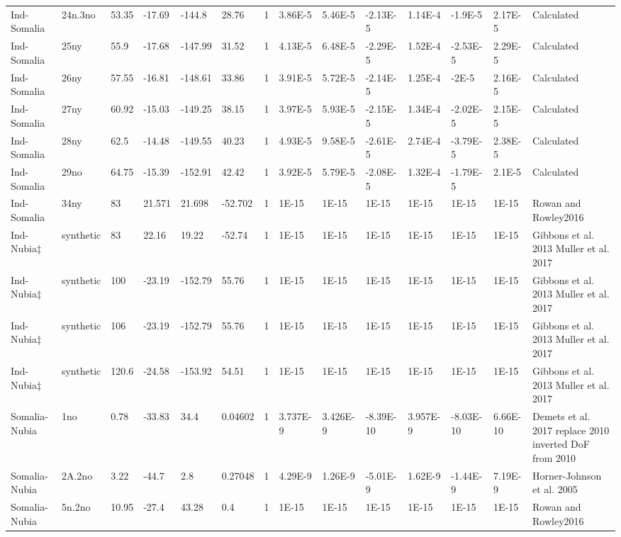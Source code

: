 \begin{landscape}
\begin{longtable}{@{}lllllllllllll>{\scriptsize}p{3.1cm}@{}}
Ind-Somalia & 24n.3no & 53.35 & -17.69 & -144.8 & 28.76 & 1 & 3.86E-5 & 5.46E-5 & -2.13E-5 & 1.14E-4 & -1.9E-5 & 2.17E-5 & Calculated \\
Ind-Somalia & 25ny & 55.9 & -17.68 & -147.99 & 31.52 & 1 & 4.13E-5 & 6.48E-5 & -2.29E-5 & 1.52E-4 & -2.53E-5 & 2.29E-5 & Calculated \\
Ind-Somalia & 26ny & 57.55 & -16.81 & -148.61 & 33.86 & 1 & 3.91E-5 & 5.72E-5 & -2.14E-5 & 1.25E-4 & -2E-5 & 2.16E-5 & Calculated \\
Ind-Somalia & 27ny & 60.92 & -15.03 & -149.25 & 38.15 & 1 & 3.97E-5 & 5.93E-5 & -2.15E-5 & 1.34E-4 & -2.02E-5 & 2.15E-5 & Calculated \\
Ind-Somalia & 28ny & 62.5 & -14.48 & -149.55 & 40.23 & 1 & 4.93E-5 & 9.58E-5 & -2.61E-5 & 2.74E-4 & -3.79E-5 & 2.38E-5 & Calculated \\
Ind-Somalia & 29no & 64.75 & -15.39 & -152.91 & 42.42 & 1 & 3.92E-5 & 5.79E-5 & -2.08E-5 & 1.32E-4 & -1.79E-5 & 2.1E-5 & Calculated \\
Ind-Somalia & 34ny & 83 & 21.571 & 21.698 & -52.702 & 1 & 1E-15 & 1E-15 & 1E-15 & 1E-15 & 1E-15 & 1E-15 & Rowan and Rowley2016 \\
Ind-Nubia$\ddagger$ & synthetic & 83 & 22.16 & 19.22 & -52.74 & 1 & 1E-15 & 1E-15 & 1E-15 & 1E-15 & 1E-15 & 1E-15 & Gibbons et al. 2013 Muller et al. 2017 \\
Ind-Nubia$\ddagger$ & synthetic & 100 & -23.19 & -152.79 & 55.76 & 1 & 1E-15 & 1E-15 & 1E-15 & 1E-15 & 1E-15 & 1E-15 & Gibbons et al. 2013 Muller et al. 2017 \\
Ind-Nubia$\ddagger$ & synthetic & 106 & -23.19 & -152.79 & 55.76 & 1 & 1E-15 & 1E-15 & 1E-15 & 1E-15 & 1E-15 & 1E-15 & Gibbons et al. 2013 Muller et al. 2017 \\
Ind-Nubia$\ddagger$ & synthetic & 120.6 & -24.58 & -153.92 & 54.51 & 1 & 1E-15 & 1E-15 & 1E-15 & 1E-15 & 1E-15 & 1E-15 & Gibbons et al. 2013 Muller et al. 2017 \\
Somalia-Nubia & 1no & 0.78 & -33.83 & 34.4 & 0.04602 & 1 & 3.737E-9 & 3.426E-9 & -8.39E-10 & 3.957E-9 & -8.03E-10 & 6.66E-10 & Demets et al. 2017 replace 2010 inverted DoF from 2010 \\
Somalia-Nubia & 2A.2no & 3.22 & -44.7 & 2.8 & 0.27048 & 1 & 4.29E-9 & 1.26E-9 & -5.01E-9 & 1.62E-9 & -1.44E-9 & 7.19E-9 & Horner-Johnson et al. 2005 \\
Somalia-Nubia & 5n.2no & 10.95 & -27.4 & 43.28 & 0.4 & 1 & 1E-15 & 1E-15 & 1E-15 & 1E-15 & 1E-15 & 1E-15 & Rowan and Rowley2016 \\

\end{longtable}
\end{landscape}
